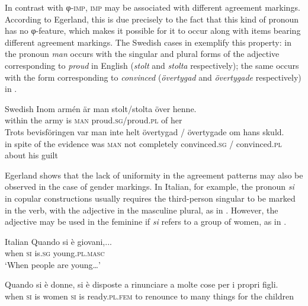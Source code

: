 \documentclass[output=paper]{langscibook}
\begin{document}
{In contrast with φ-\textsc{imp}, \textsc{imp} may be associated with different agreement markings. According to Egerland, this is due precisely to the fact that this kind of pronoun has no φ-fea\-ture, which makes it possible for it to occur along with items bearing different agreement markings. The Swedish cases in  exemplify this property: in  the pronoun} {\textit{man} }{occurs with the singular and plural forms of the adjective corresponding to} {\textit{proud} }{in English (}{\textit{stolt} }{and} {\textit{stolta} }{respectively); the same occurs with the form corresponding to} {\textit{convinced} }({\textit{övertygad}} {and} {\textit{övertygade} }{respectively) in .}

\ea\label{ex:avelar:8} Swedish \citep[78]{Egerland2003}
 \ea\label{ex:avelar:8a} 
  \gll Inom armén     är   man   {stolt/stolta}         över henne. \\
         within {the army}   is   \textsc{man}   {proud.\textsc{sg}/proud.\textsc{pl}}   of her\\
 \ex\label{ex:avelar:8b} 
  \gll Trots     bevisföringen   var   man   inte   helt  {övertygad / övertygade}       om   hans skuld.\\
         {in spite of}  {the evidence}     was  \textsc{man}   not   completely {convinced.\textsc{sg} / convinced.\textsc{pl}}   about   his guilt\\
\z 
\z

{Egerland shows that the lack of uniformity in the agreement patterns may also be observed in the case of gender markings. In Italian, for example, the pronoun} {\textit{si} }{in copular constructions usually requires the third-person singular to be marked in the verb, with the adjective in the masculine plural, as in . However, the adjective may be used in the feminine if} {\textit{si} }{refers to a group of women, as in .}

\ea\label{ex:avelar:9} Italian \citep[79]{Egerland2003}
 \ea\label{ex:avelar:9a}
  \gll Quando   si   è     giovani,...\\
         when \textsc{si} is.\textsc{sg} young.\textsc{pl.masc}\\
  \glt ‘When people are young…’

 \ex\label{ex:avelar:9b} 
  \gll Quando si è donne, si è disposte a rinunciare a   molte  cose   per i {propri figli}.\\
         when \textsc{si} is women \textsc{si} is ready.\textsc{pl.fem} to renounce to many  things  for   the children\\
\z 
\z
\end{document}
